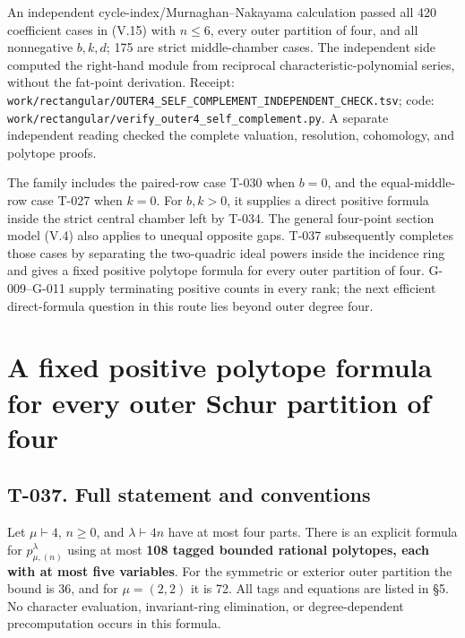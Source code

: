 \documentclass[
  10pt,
]{article}
\begin{document}
An independent cycle-index/Murnaghan--Nakayama calculation passed all
420 coefficient cases in (V.15) with \(n\le6\), every outer partition of
four, and all nonnegative \(b,k,d\); 175 are strict middle-chamber
cases. The independent side computed the right-hand module from
reciprocal characteristic-polynomial series, without the fat-point
derivation. Receipt:
\texttt{\small work/\allowbreak{}rectangular/\allowbreak{}OUTER4\_\allowbreak{}SELF\_\allowbreak{}COMPLEMENT\_\allowbreak{}INDEPENDENT\_\allowbreak{}CHECK.tsv};
code:
\texttt{\small work/\allowbreak{}rectangular/\allowbreak{}verify\_\allowbreak{}outer4\_\allowbreak{}self\_\allowbreak{}complement.py}.
A separate independent reading checked the complete valuation,
resolution, cohomology, and polytope proofs.

The family includes the paired-row case T-030 when \(b=0\), and the
equal-middle-row case T-027 when \(k=0\). For \(b,k>0\), it supplies a
direct positive formula inside the strict central chamber left by T-034.
The general four-point section model (V.4) also applies to unequal
opposite gaps. T-037 subsequently completes those cases by separating
the two-quadric ideal powers inside the incidence ring and gives a fixed
positive polytope formula for every outer partition of four.
G-009--G-011 supply terminating positive counts in every rank; the next
efficient direct-formula question in this route lies beyond outer degree
four.

\section{A fixed positive polytope formula for every outer Schur
partition of
four}\label{a-fixed-positive-polytope-formula-for-every-outer-schur-partition-of-four}

\subsection{T-037. Full statement and
conventions}\label{t-037.-full-statement-and-conventions}

Let \(\mu\vdash4\), \(n\ge0\), and \(\lambda\vdash4n\) have at most four
parts. There is an explicit formula for \(p_{\mu,(n)}^\lambda\) using at
most \textbf{108 tagged bounded rational polytopes, each with at most
five variables}. For the symmetric or exterior outer partition the bound
is 36, and for \(\mu=(2,2)\) it is 72. All tags and equations are listed
in §5. No character evaluation, invariant-ring elimination, or
degree-dependent precomputation occurs in this formula.
\end{document}
